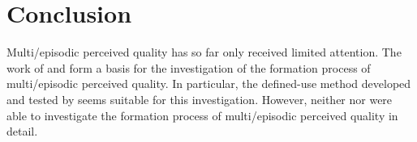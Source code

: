\section{Conclusion}
Multi\-/episodic perceived quality has so far only received limited attention.
The work of \citet{duncanson_average_1969} and \citet{moller_single-call_2011} form a basis for the investigation of the formation process of multi\-/episodic perceived quality.
In particular, the defined-use method developed and tested by \citet{moller_single-call_2011} seems suitable for this investigation.
However, neither \citet{duncanson_average_1969} nor \citet{moller_single-call_2011} were able to investigate the formation process of multi\-/episodic perceived quality in detail.





